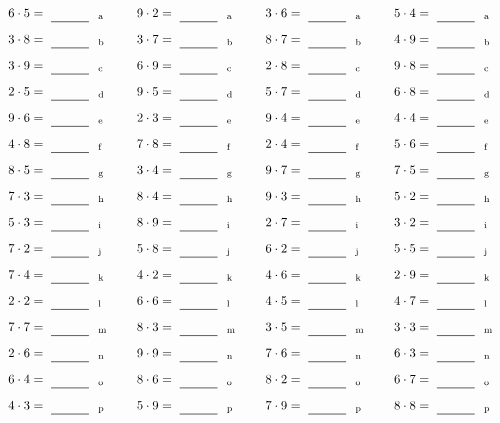 \documentclass
[
  draft    = true,
  fontsize = 11pt,
  parskip  = half-
]
{scrartcl}
\begin{document}
\par\vfill\par
\begin{align*}
    \pline{6\cdot5}&=\rline{a}
  & \pline{9\cdot2}&=\rline{a}
  & \pline{3\cdot6}&=\rline{a}
  & \pline{5\cdot4}&=\rline{a} \\[1ex]
    \pline{3\cdot8}&=\rline{b}
  & \pline{3\cdot7}&=\rline{b}
  & \pline{8\cdot7}&=\rline{b}
  & \pline{4\cdot9}&=\rline{b} \\[1ex]
    \pline{3\cdot9}&=\rline{c}
  & \pline{6\cdot9}&=\rline{c}
  & \pline{2\cdot8}&=\rline{c}
  & \pline{9\cdot8}&=\rline{c} \\[1ex]
    \pline{2\cdot5}&=\rline{d}
  & \pline{9\cdot5}&=\rline{d}
  & \pline{5\cdot7}&=\rline{d}
  & \pline{6\cdot8}&=\rline{d} \\[1ex]
    \pline{9\cdot6}&=\rline{e}
  & \pline{2\cdot3}&=\rline{e}
  & \pline{9\cdot4}&=\rline{e}
  & \pline{4\cdot4}&=\rline{e} \\[1ex]
    \pline{4\cdot8}&=\rline{f}
  & \pline{7\cdot8}&=\rline{f}
  & \pline{2\cdot4}&=\rline{f}
  & \pline{5\cdot6}&=\rline{f} \\[1ex]
    \pline{8\cdot5}&=\rline{g}
  & \pline{3\cdot4}&=\rline{g}
  & \pline{9\cdot7}&=\rline{g}
  & \pline{7\cdot5}&=\rline{g} \\[1ex]
    \pline{7\cdot3}&=\rline{h}
  & \pline{8\cdot4}&=\rline{h}
  & \pline{9\cdot3}&=\rline{h}
  & \pline{5\cdot2}&=\rline{h} \\[1ex]
    \pline{5\cdot3}&=\rline{i}
  & \pline{8\cdot9}&=\rline{i}
  & \pline{2\cdot7}&=\rline{i}
  & \pline{3\cdot2}&=\rline{i} \\[1ex]
    \pline{7\cdot2}&=\rline{j}
  & \pline{5\cdot8}&=\rline{j}
  & \pline{6\cdot2}&=\rline{j}
  & \pline{5\cdot5}&=\rline{j} \\[1ex]
    \pline{7\cdot4}&=\rline{k}
  & \pline{4\cdot2}&=\rline{k}
  & \pline{4\cdot6}&=\rline{k}
  & \pline{2\cdot9}&=\rline{k} \\[1ex]
    \pline{2\cdot2}&=\rline{l}
  & \pline{6\cdot6}&=\rline{l}
  & \pline{4\cdot5}&=\rline{l}
  & \pline{4\cdot7}&=\rline{l} \\[1ex]
    \pline{7\cdot7}&=\rline{m}
  & \pline{8\cdot3}&=\rline{m}
  & \pline{3\cdot5}&=\rline{m}
  & \pline{3\cdot3}&=\rline{m} \\[1ex]
    \pline{2\cdot6}&=\rline{n}
  & \pline{9\cdot9}&=\rline{n}
  & \pline{7\cdot6}&=\rline{n}
  & \pline{6\cdot3}&=\rline{n} \\[1ex]
    \pline{6\cdot4}&=\rline{o}
  & \pline{8\cdot6}&=\rline{o}
  & \pline{8\cdot2}&=\rline{o}
  & \pline{6\cdot7}&=\rline{o} \\[1ex]
    \pline{4\cdot3}&=\rline{p}
  & \pline{5\cdot9}&=\rline{p}
  & \pline{7\cdot9}&=\rline{p}
  & \pline{8\cdot8}&=\rline{p}
\end{align*}
\end{document}
